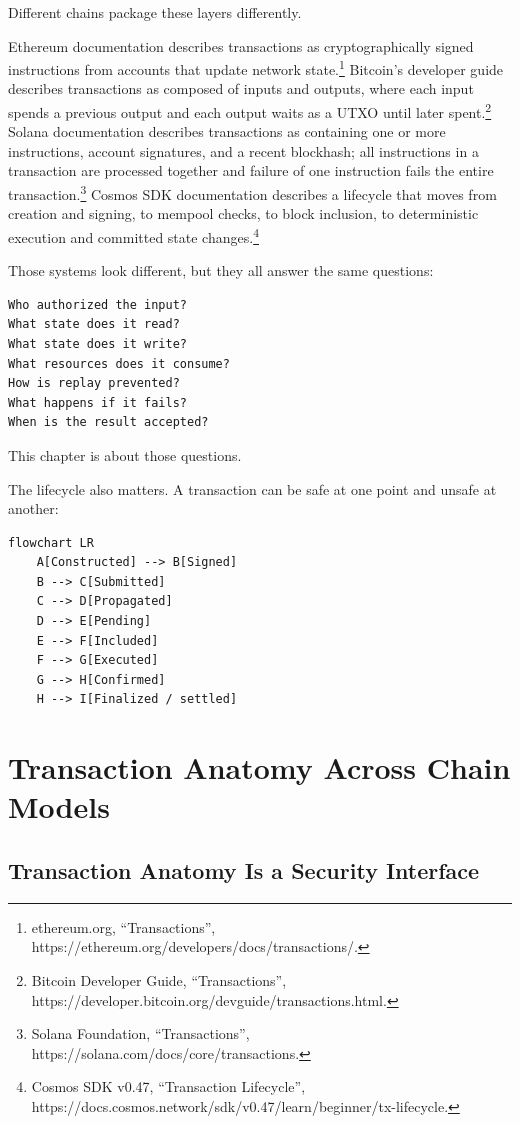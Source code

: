 Different chains package these layers differently.

Ethereum documentation describes transactions as cryptographically
signed instructions from accounts that update network state.\footnote{ethereum.org,
  ``Transactions'', https://ethereum.org/developers/docs/transactions/.}
Bitcoin's developer guide describes transactions as composed of inputs
and outputs, where each input spends a previous output and each output
waits as a UTXO until later spent.\footnote{Bitcoin Developer Guide,
  ``Transactions'',
  https://developer.bitcoin.org/devguide/transactions.html.} Solana
documentation describes transactions as containing one or more
instructions, account signatures, and a recent blockhash; all
instructions in a transaction are processed together and failure of one
instruction fails the entire transaction.\footnote{Solana Foundation,
  ``Transactions'', https://solana.com/docs/core/transactions.} Cosmos
SDK documentation describes a lifecycle that moves from creation and
signing, to mempool checks, to block inclusion, to deterministic
execution and committed state changes.\footnote{Cosmos SDK v0.47,
  ``Transaction Lifecycle'',
  https://docs.cosmos.network/sdk/v0.47/learn/beginner/tx-lifecycle.}

Those systems look different, but they all answer the same questions:

\begin{lstlisting}
Who authorized the input?
What state does it read?
What state does it write?
What resources does it consume?
How is replay prevented?
What happens if it fails?
When is the result accepted?
\end{lstlisting}

This chapter is about those questions.

The lifecycle also matters. A transaction can be safe at one point and
unsafe at another:

\begin{lstlisting}
flowchart LR
    A[Constructed] --> B[Signed]
    B --> C[Submitted]
    C --> D[Propagated]
    D --> E[Pending]
    E --> F[Included]
    F --> G[Executed]
    G --> H[Confirmed]
    H --> I[Finalized / settled]
\end{lstlisting}

\section{Transaction Anatomy Across Chain Models}

\subsection{Transaction Anatomy Is a Security Interface}

